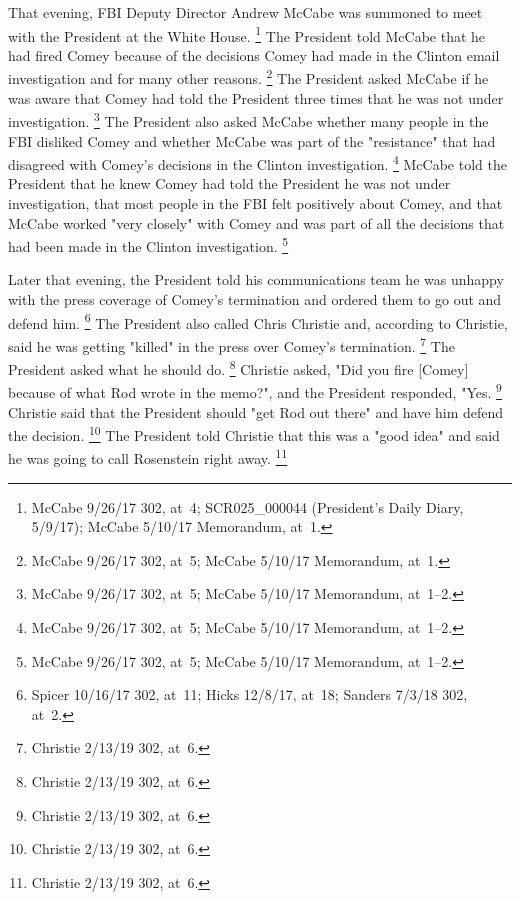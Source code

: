 That evening, FBI Deputy Director Andrew McCabe was summoned to meet with the President at the White House.%
\footnote{McCabe 9/26/17 302, at~4;
SCR025\_000044 (President's Daily Diary, 5/9/17);
McCabe 5/10/17 Memorandum, at~1.}
The President told McCabe that he had fired Comey because of the decisions Comey had made in the Clinton email investigation and for many other reasons.%
\footnote{McCabe 9/26/17 302, at~5;
McCabe 5/10/17 Memorandum, at~1.}
The President asked McCabe if he was aware that Comey had told the President three times that he was not under investigation.%
\footnote{McCabe 9/26/17 302, at~5;
McCabe 5/10/17 Memorandum, at~1--2.}
The President also asked McCabe whether many people in the FBI disliked Comey and whether McCabe was part of the "resistance" that had disagreed with Comey's decisions in the Clinton investigation.%
\footnote{McCabe 9/26/17 302, at~5;
McCabe 5/10/17 Memorandum, at~1--2.}
McCabe told the President that he knew Comey had told the President he was not under investigation, that most people in the FBI felt positively about Comey, and that McCabe worked "very closely" with Comey and was part of all the decisions that had been made in the Clinton investigation.%
\footnote{McCabe 9/26/17 302, at~5;
McCabe 5/10/17 Memorandum, at~1--2.}

Later that evening, the President told his communications team he was unhappy with the press coverage of Comey's termination and ordered them to go out and defend him.%
\footnote{Spicer 10/16/17 302, at~11;
Hicks 12/8/17, at~18;
Sanders 7/3/18 302, at~2.}
The President also called Chris Christie and, according to Christie, said he was getting "killed" in the press over Comey's termination.%
\footnote{Christie 2/13/19 302, at~6.}
The President asked what he should do.%
\footnote{Christie 2/13/19 302, at~6.}
Christie asked, "Did you fire [Comey] because of what Rod wrote in the memo?", and the President responded, "Yes.%
\footnote{Christie 2/13/19 302, at~6.}
Christie said that the President should "get Rod out there" and have him defend the decision.%
\footnote{Christie 2/13/19 302, at~6.}
The President told Christie that this was a "good idea" and said he was going to call Rosenstein right away.%
\footnote{Christie 2/13/19 302, at~6.}


